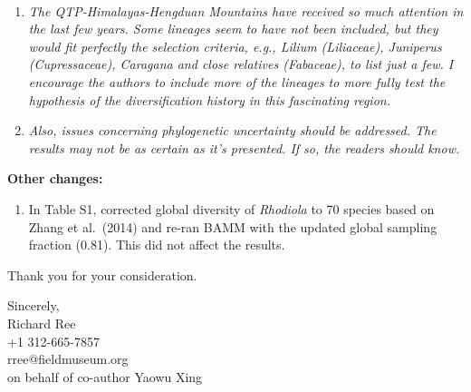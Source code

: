 \documentclass[12pt]{letter}
\begin{document}
\begin{letter}{ \\

}
\begin{enumerate}
  Despite the uncertainty and scarcity of information needed to
  distinguish the Himalayas and QTP proper in terms of plant species
  distributions, we recoded our data set, treating them as separate
  areas. We scored 210 out of 4,668 species (4.5\%) as occurring in
  the QTP. We then generated new ancestral range reconstructions and
  estimated rates of dispersal and \textit{in situ} diversification
  through time. The results are summarized in Figures SXXX. They show
  that

\item \textit{The QTP-Himalayas-Hengduan Mountains have received so
    much attention in the last few years. Some lineages seem to have
    not been included, but they would fit perfectly the selection
    criteria, e.g., Lilium (Liliaceae), Juniperus (Cupressaceae),
    Caragana and close relatives (Fabaceae), to list just a few. I
    encourage the authors to include more of the lineages to more
    fully test the hypothesis of the diversification history in this
    fascinating region.}

\item \textit{Also, issues concerning phylogenetic uncertainty should
    be addressed. The results may not be as certain as it's
    presented. If so, the readers should know.}

\end{enumerate}

\textbf{Other changes:}

\begin{enumerate}

\item In Table S1, corrected global diversity of \textit{Rhodiola} to
  70 species based on Zhang et al.\ (2014) and re-ran BAMM with the
  updated global sampling fraction (0.81). This did not affect the
  results.

\end{enumerate}


Thank you for your consideration.


\closing{Sincerely,\\
  \bigskip
  Richard Ree\\
  +1 312-665-7857\\
  rree@fieldmuseum.org\\
  \medskip on behalf of co-author Yaowu Xing
  }


\end{letter}
\end{document}
